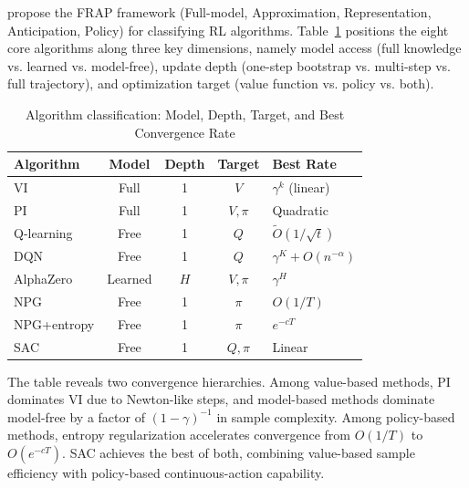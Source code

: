 \citet{moerland2022unifying} propose the FRAP framework (Full-model, Approximation, Representation, Anticipation, Policy) for classifying RL algorithms. Table~\ref{tab:frap} positions the eight core algorithms along three key dimensions, namely model access (full knowledge vs. learned vs. model-free), update depth (one-step bootstrap vs. multi-step vs. full trajectory), and optimization target (value function vs. policy vs. both).

\begin{table}[h!]
\centering
\caption{Algorithm classification: Model, Depth, Target, and Best Convergence Rate}
\label{tab:frap}
\begin{tabular}{l|ccc|l}
\hline
Algorithm & Model & Depth & Target & Best Rate \\
\hline
VI & Full & 1 & $V$ & $\gamma^k$ (linear) \\
PI & Full & 1 & $V, \pi$ & Quadratic \\
Q-learning & Free & 1 & $Q$ & $\tilde{O}(1/\sqrt{t})$ \\
DQN & Free & 1 & $Q$ & $\gamma^K + O(n^{-\alpha})$ \\
AlphaZero & Learned & $H$ & $V, \pi$ & $\gamma^H$ \\
NPG & Free & 1 & $\pi$ & $O(1/T)$ \\
NPG+entropy & Free & 1 & $\pi$ & $e^{-cT}$ \\
SAC & Free & 1 & $Q, \pi$ & Linear \\
\hline
\end{tabular}
\end{table}

The table reveals two convergence hierarchies. Among value-based methods, PI dominates VI due to Newton-like steps, and model-based methods dominate model-free by a factor of $(1-\gamma)^{-1}$ in sample complexity. Among policy-based methods, entropy regularization accelerates convergence from $O(1/T)$ to $O(e^{-cT})$. SAC achieves the best of both, combining value-based sample efficiency with policy-based continuous-action capability.
